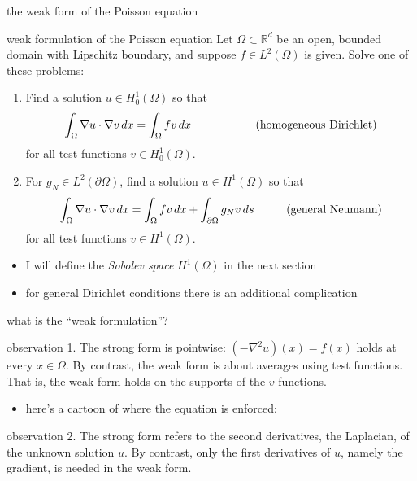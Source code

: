 \documentclass[10pt,
               svgnames,
               hyperref={colorlinks,
                         citecolor=DeepPink4,
                         linkcolor=FireBrick,
                         urlcolor=blue},
               usepdftitle=false]{beamer}
\newcommand{\RR}{\mathbb{R}}
\newcommand{\grad}{\nabla}
\begin{document}
\begin{frame}{the weak form of the Poisson equation}

\begin{block}{weak formulation of the Poisson equation}
Let $\Omega\subset \RR^d$ be an open, bounded domain with Lipschitz boundary, and suppose $f\in L^2(\Omega)$ is given.  Solve one of these problems:
\begin{enumerate}
\item Find a solution \alert{$u\in H_0^1(\Omega)$} so that
    $$\int_\Omega \grad u \cdot \grad v\,dx = \int_\Omega f v\,dx \hspace{20mm} \text{(homogeneous Dirichlet)}$$
for all test functions \alert{$v\in H_0^1(\Omega)$}.
\item For $g_N\in L^2(\partial \Omega)$, find a solution \alert{$u\in H^1(\Omega)$} so that
    $$\int_\Omega \grad u \cdot \grad v\,dx = \int_\Omega f v\,dx + \int_{\partial\Omega} g_N v\,ds \hspace{10mm} \text{(general Neumann)}$$
for all test functions \alert{$v\in H^1(\Omega)$}.
\end{enumerate}
\end{block}

\begin{itemize}
\item \alert{I will define the \emph{Sobolev space} $H^1(\Omega)$ in the next section}
\item for general Dirichlet conditions there is an additional complication
\end{itemize}
\end{frame}


\begin{frame}{what is the ``weak formulation''?}

\begin{block}{observation 1.}
The strong form is pointwise: $(-\grad^2 u)(x) = f(x)$ holds at every $x\in \Omega$.  By contrast, \alert{the weak form is about averages using test functions}.  That is, the weak form holds on the supports of the $v$ functions.
\end{block}

\begin{itemize}
\item here's a cartoon of where the equation is enforced:
\end{itemize}

\vspace{25mm}

\begin{block}{observation 2.}
The strong form refers to the second derivatives, the Laplacian, of the unknown solution $u$.  By contrast, \alert{only the first derivatives of $u$}, namely the gradient, \alert{is needed in the weak form}.
\end{block}
\end{frame}
\end{document}
